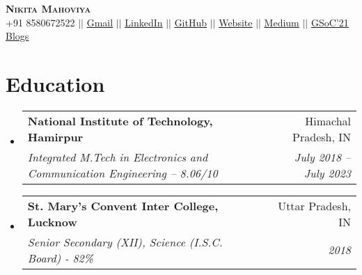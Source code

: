 \documentclass[letterpaper,11pt]{article}
\makeatletter
\newcommand{\resumeSubheading}[4]{
  \vspace{-2pt}\item
    \begin{tabular*}{0.97\textwidth}[t]{l@{\extracolsep{\fill}}r}
      \textbf{#1} & #2 \\
      \textit{\small#3} & \textit{\small #4} \\
    \end{tabular*}\vspace{-7pt}
}
\newcommand{\resumeSubHeadingListStart}{\begin{itemize}[leftmargin=0.15in, label={}]}
\newcommand{\resumeSubHeadingListEnd}{\end{itemize}}
\makeatother
\begin{document}

\begin{center}
    \textbf{\Huge \scshape Nikita Mahoviya} \\ \vspace{1pt}
    \small +91 8580672522 $||$  \href{mailto:mahoviyanikita@gmail.com}{\underline{Gmail}} $||$ 
    \href{https://www.linkedin.com/in/nikita-mahoviya-28034b171//}{\underline{LinkedIn}} $||$
    \href{https://github.com/nikitamahoviya}{\underline{GitHub}} $||$
    \href{https://www.iamannitian.com}{\underline{Website}} $||$
    \href{https://mahoviyanikita.medium.com/}{\underline{Medium}} 
    $||$
    \href{https://nrnb-gsoc21.blogspot.com/}{\underline{GSoC'21 Blogs}}
\end{center}


\section{Education}
  \resumeSubHeadingListStart
    \resumeSubheading
      {National Institute of Technology, Hamirpur}{Himachal Pradesh, IN}
      {Integrated M.Tech in Electronics and Communication Engineering -- 8.06/10}{July 2018 -- July 2023}
     \resumeSubheading
      {St. Mary's Convent Inter College, Lucknow}{Uttar Pradesh, IN}
      {Senior Secondary (XII), Science (I.S.C. Board) - 82\%}{2018}
  \resumeSubHeadingListEnd
  
\end{document}
